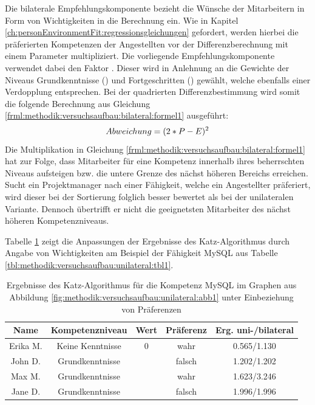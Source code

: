 Die bilaterale Empfehlungskomponente bezieht die Wünsche der Mitarbeitern in Form von Wichtigkeiten in die Berechnung ein. Wie in Kapitel \ref{ch:personEnvironmentFit:regressionsgleichungen} gefordert, werden hierbei die präferierten Kompetenzen der Angestellten vor der Differenzberechnung mit einem Parameter multipliziert. Die vorliegende Empfehlungskomponente verwendet dabei den Faktor \faktorString. Dieser wird in Anlehnung an die Gewichte der Niveaus Grundkenntnisse (\kantengewichtString) und Fortgeschritten (\kantengewichtHochString) gewählt, welche ebenfalls einer Verdopplung entsprechen. Bei der quadrierten Differenzbestimmung wird somit die folgende Berechnung aus Gleichung \ref{frml:methodik:versuchsaufbau:bilateral:formel1} ausgeführt:
\begin{equation}
	Abweichung = (2 * P - E)^2
	\label{frml:methodik:versuchsaufbau:bilateral:formel1}
\end{equation}
Die Multiplikation in Gleichung \ref{frml:methodik:versuchsaufbau:bilateral:formel1} hat zur Folge, dass Mitarbeiter für eine Kompetenz innerhalb ihres beherrschten Niveaus aufsteigen bzw. die untere Grenze des nächst höheren Bereichs erreichen. Sucht ein Projektmanager nach einer Fähigkeit, welche ein Angestellter präferiert, wird dieser bei der Sortierung folglich besser bewertet als bei der unilateralen Variante. Dennoch übertrifft er nicht die geeignetsten Mitarbeiter des nächst höheren Kompetenzniveaus.

Tabelle \ref{tbl:methodik:versuchsaufbau:bilateral:tbl1} zeigt die Anpassungen der Ergebnisse des Katz-Algorithmus durch Angabe von Wichtigkeiten am Beispiel der Fähigkeit MySQL aus Tabelle \ref{tbl:methodik:versuchsaufbau:unilateral:tbl1}.

\begin{table}[h]
	\centering
	\begin{tabular}{c|c|c|c|c}
		Name & Kompetenzniveau & Wert & Präferenz & Erg. uni-/bilateral \\
		\hline
		\rowcolor{exxetagray}Erika M. & Keine Kenntnisse & 0 & wahr & 0.565/1.130\\
		\hline
		\rowcolor{itemcolor}John D. & Grundkenntnisse  & \kantengewicht & falsch & 1.202/1.202 \\
		\rowcolor{itemcolor}Max M. & Grundkenntnisse  & \kantengewicht & wahr & 1.623/3.246\\
		\rowcolor{itemcolor}Jane D. & Grundkenntnisse  & \kantengewicht & falsch & 1.996/1.996
	\end{tabular}
	\caption{Ergebnisse des Katz-Algorithmus für die Kompetenz MySQL im Graphen aus Abbildung \ref{fig:methodik:versuchsaufbau:unilateral:abb1} unter Einbeziehung von Präferenzen}
	\label{tbl:methodik:versuchsaufbau:bilateral:tbl1}
\end{table}

